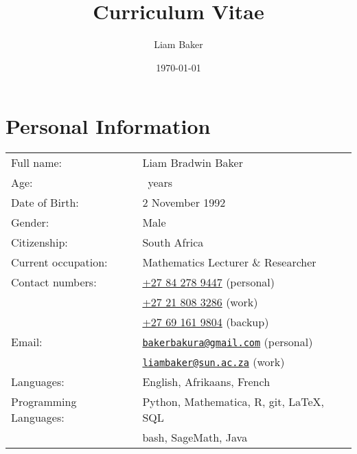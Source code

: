 \documentclass{article}
\author{Liam Baker}
\title{Curriculum Vitae}
\date{\today}
\newcommand{\email}[1]{\href{mailto:#1}{\texttt{#1}}}
\begin{document}
 \maketitle


\section{Personal Information}
\begin{center} \begin{tabular}{ll}
	Full name: 								& Liam Bradwin Baker \\
	Age: 											& \myyears~years \\
	Date of Birth:						& 2 November 1992 \\
	Gender: 									& Male \\
	Citizenship:							& South Africa \\
	Current occupation:				& Mathematics Lecturer \& Researcher \\
	Contact numbers:					& \href{tel:+27842789447}{+27 84 278 9447} (personal) \\
														& \href{tel:+27218083286}{+27 21 808 3286} (work) \\
														& \href{tel:+27605074681}{+27 69 161 9804} (backup) \\
	Email:										& \email{bakerbakura@gmail.com} (personal)\\
														& \email{liambaker@sun.ac.za} (work) \\
	Languages:								& English, \footnotesize{Afrikaans}, \tiny{French} \\
	Programming Languages:		& Python, Mathematica, R, git, \LaTeX, SQL \\
														& \footnotesize{bash, SageMath, Java} \\
\end{tabular} \end{center}
\end{document}
